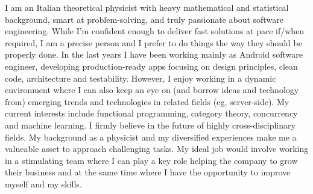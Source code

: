 
\begin{cvparagraph}
I am an Italian theoretical physicist with heavy mathematical and statistical 
background, smart at problem-solving, and truly passionate about software engineering. 
While 
I'm confident enough to
deliver 
fast solutions at pace
if/when
required, 
I am a precise person and I prefer to do things the way they
should be properly done.
In the last years I have been working mainly as Android software engineer,  developing production-ready apps 
	focusing on design principles, clean code, architecture and testability.
 However, I enjoy  working in a dynamic
environment 
 where I can also keep an eye on (and borrow ideas and technology from) emerging trends and technologies in related
	fields (eg, server-side).
	My current interests include functional programming, category theory, concurrency and machine learning. 
 I firmly
believe in the future of highly cross-disciplinary fields.
My background as a physicist and my diversified experiences make me a valueable asset to approach challenging tasks. 
My ideal job would involve working in a stimulating team where I
can play a key role helping the company to grow their business and at the same time
where I have the opportunity to improve myself and my skills.
\end{cvparagraph}

